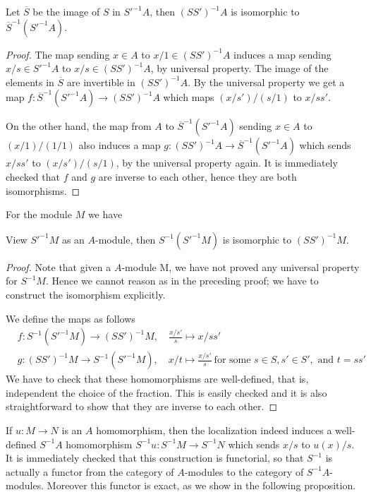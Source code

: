 \begin{proposition}
\label{proposition-localize-twice}
Let $\overline{S}$ be the image of $S$ in $S'^{-1}A$, then
$(SS')^{-1}A$ is isomorphic to $\overline{S}^{-1}(S'^{-1}A)$.
\end{proposition}

\begin{proof}
The map sending $x\in A$ to $x/1\in (SS')^{-1}A$ induces a map
sending $x/s\in S'^{-1}A$ to $x/s \in (SS')^{-1}A$, by universal
property. The image of the elements in $\overline{S}$ are invertible
in $(SS')^{-1}A$. By the universal property we get a map
$f : \overline{S}^{-1}(S'^{-1}A) \to (SS')^{-1}A$ which maps
$(x/s')/(s/1)$ to $x/ss'$.

\medskip\noindent
On the other hand, the map from $A$ to $\overline{S}^{-1}(S'^{-1}A)$
sending $x\in A$ to $(x/1)/(1/1)$ also induces a map
$g : (SS')^{-1}A \to \overline{S}^{-1}(S'^{-1}A)$ which sends $x/ss'$
to $(x/s')/(s/1)$, by the universal property again. It is
immediately checked that $f$ and $g$ are inverse to each other,
hence they are both isomorphisms.
\end{proof}

\noindent
For the module $M$ we have

\begin{proposition}
\label{proposition-localize-twice-module}
View $S'^{-1}M$ as an $A$-module, then $S^{-1}(S'^{-1}M)$ is
isomorphic to $(SS')^{-1}M$.
\end{proposition}

\begin{proof}
Note that given a $A$-module M, we have not proved any
universal property for $S^{-1}M$. Hence we cannot reason
as in the preceding proof; we have to construct the isomorphism explicitly.

\medskip\noindent
We define the maps as follows
\begin{align*}
& f : S^{-1}(S'^{-1}M) \longrightarrow (SS')^{-1}M, \quad \frac{x/s'}{s}\mapsto
x/ss'\\
& g : (SS')^{-1}M \longrightarrow S^{-1}(S'^{-1}M), \quad x/t\mapsto
\frac{x/s'}{s}\ \text{for some }s\in S, s'\in S', \text{ and }
t = ss'
\end{align*}
We have to check that these homomorphisms are well-defined, that is,
independent the choice of the fraction. This is easily checked and it is also
straightforward to show that they are inverse to each other.
\end{proof}

\noindent
If $u : M \to N$ is an $A$ homomorphism, then the localization indeed
induces a well-defined $S^{-1}A$ homomorphism $S^{-1}u : S^{-1}M \to
S^{-1}N$ which sends $x/s$ to $u(x)/s$. It is immediately checked that
this construction is functorial, so that $S^{-1}$
is actually a functor from the category of $A$-modules to the
category of $S^{-1}A$-modules. Moreover this functor is exact,
as we show in the following proposition.


